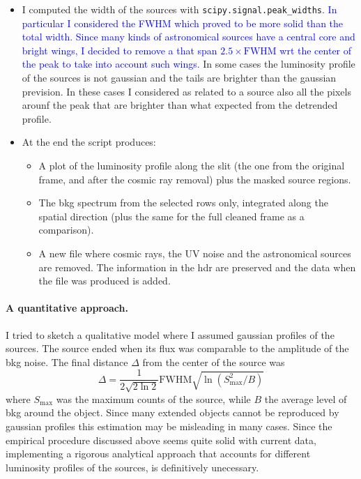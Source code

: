 \documentclass{article}
\newcommand{\arbitrario}[1]{\textcolor{blue}{#1}}
\begin{document}
\begin{itemize}
	\item I computed the width of the sources with \texttt{scipy.signal.peak\_widths}. \arbitrario{In particular I considered the FWHM which proved to be more solid than the total width. Since many kinds of astronomical sources have a central core and bright wings, I decided to remove a that span $2.5\times\text{FWHM}$ wrt the center of the peak to take into account such wings.}	
	In some cases the luminosity profile of the sources is not gaussian and the tails are brighter than the gaussian prevision. In these cases I considered as related to a source also all the pixels arounf the peak that are brighter than what expected from the detrended profile.
	
	\item At the end the script produces:
	\begin{itemize}
		\item A plot of the luminosity profile along the slit (the one from the original frame, and after the cosmic ray removal) plus the masked source regions.
		\item The bkg spectrum from the selected rows only, integrated along the spatial direction (plus the same for the full cleaned frame as a comparison).
		\item A new file where cosmic rays, the UV noise and the astronomical sources are removed. The information in the hdr are preserved and the data when the file was produced is added.
	\end{itemize}
\end{itemize}


\paragraph{A quantitative approach.} I tried to sketch a qualitative model where I assumed gaussian profiles of the sources. The source ended when its flux was comparable to the amplitude of the bkg noise. The final distance $\Delta$ from the center of the source was
\[\Delta = \frac{1}{2\sqrt{2\ln 2}}\text{FWHM}\sqrt{\ln(S_\text{max}^2/B)}   \]
where $S_\text{max}$ was the maximum counts of the source, while $B$ the average level of bkg around the object. Since many extended objects cannot be reproduced by gaussian profiles this estimation may be misleading in many cases. Since the empirical procedure discussed above seems quite solid with current data, implementing a rigorous analytical approach that accounts for different luminosity profiles of the sources, is definitively unecessary.
\end{document}
